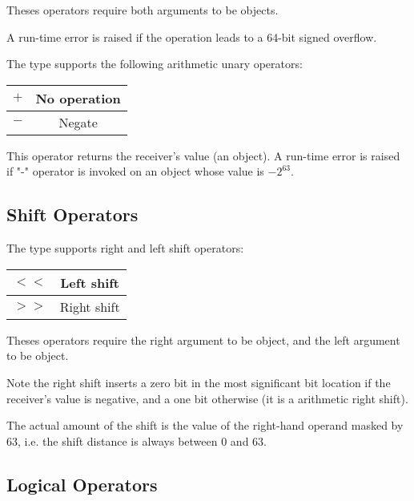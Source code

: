 Theses operators require both arguments to be  objects.\newline

A run-time error is raised if the operation leads to a 64-bit signed overflow.

The  type supports the following arithmetic unary operators:\newline

\begin{tabular}{|c|c|}
\hline
$+$ & No operation \\
\hline
$-$ & Negate \\
\hline
\end{tabular}\newline

This operator returns the receiver's value (an  object). A run-time error is raised if "-" operator is invoked on an object whose value is $-2^{63}$.






\subsection{Shift Operators}


The  type supports right and left shift operators:\newline

\begin{tabular}{|c|c|}
\hline
$<<$ & Left shift \\
\hline
$>>$ & Right shift \\
\hline
\end{tabular}\newline

Theses operators require the right argument to be  object, and the left argument to be  object.\newline

Note the right shift inserts a zero bit in the most significant bit location if the receiver's value is negative, and a one bit otherwise (it is a arithmetic right shift).\newline

The actual amount of the shift is the value of the right-hand operand masked by 63, i.e. the shift distance is always between 0 and 63.




\subsection{Logical Operators}


